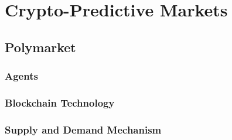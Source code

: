 \section{Crypto-Predictive Markets}
\label{sec:crypto_predictive_markets}

\lipsum[2]

\subsection{Polymarket}
\label{subsec:polymarket}

\lipsum[2]

\subsubsection{Agents}
\label{subsubsec:agents}

\lipsum[2]

\subsubsection{Blockchain Technology}
\label{subsubsec:blockchain_technology}

\lipsum[2]

\subsubsection{Supply and Demand Mechanism}
\label{subsubsec:supply_and_demand_mechanism}

\lipsum[2]